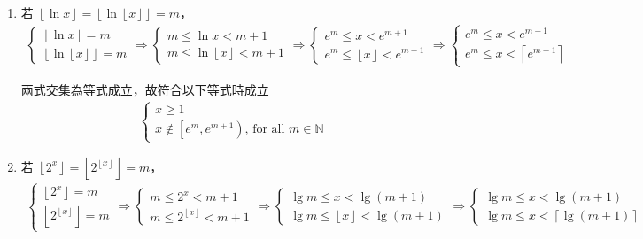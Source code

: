 \documentclass[11pt]{article}
\begin{document}
\begin{enumerate}
	\item 若 $\left \lfloor \ln x \right \rfloor = \left \lfloor \ln \left \lfloor x \right \rfloor \right \rfloor = m$，
		\begin{align*}
			\left\{\begin{matrix}
				\left \lfloor \ln x \right \rfloor = m\\ 
				\left \lfloor \ln \left \lfloor x \right \rfloor \right \rfloor = m
			\end{matrix}\right. 
			\Rightarrow
			\left\{\begin{matrix}
				m \le \ln x < m+1 \\ 
				m \le \ln \left \lfloor x \right \rfloor < m+1
			\end{matrix}\right.
			\Rightarrow
			\left\{\begin{matrix}
				e^m \le x < e^{m+1} \\ 
				e^m \le \left \lfloor x \right \rfloor < e^{m+1}
			\end{matrix}\right.
			\Rightarrow
			\left\{\begin{matrix}
				e^m \le x < e^{m+1} \\ 
				e^m \le x < \left \lceil e^{m+1} \right \rceil
			\end{matrix}\right.
		\end{align*}
		
		兩式交集為等式成立，故符合以下等式時成立
		\begin{align*}
			\left\{\begin{matrix}
				x \ge 1\\
				x \notin \left [ e^m, e^{m+1}\right ) \text{, for all } m \in \mathbb{N}
			\end{matrix}\right.
		\end{align*}
		
	\item 若 $\left \lfloor 2^x \right \rfloor = \left \lfloor 2^{\left \lfloor x \right \rfloor} \right \rfloor = m$，
		\begin{align*}
			\left\{\begin{matrix}
				\left \lfloor 2^x \right \rfloor = m\\ 
				\left \lfloor 2^{\left \lfloor x \right \rfloor} \right \rfloor = m
			\end{matrix}\right. 
			\Rightarrow
			\left\{\begin{matrix}
				m \le 2^x < m+1 \\ 
				m \le 2^{\left \lfloor x \right \rfloor} < m+1
			\end{matrix}\right.
			\Rightarrow
			\left\{\begin{matrix}
				\lg m \le x < \lg (m+1) \\ 
				\lg m \le \left \lfloor x \right \rfloor < \lg (m+1)
			\end{matrix}\right.
			\Rightarrow
			\left\{\begin{matrix}
				\lg m \le x < \lg (m+1) \\ 
				\lg m \le x < \left \lceil \lg (m+1) \right \rceil
			\end{matrix}\right.
		\end{align*}
		

\end{enumerate}
\end{document}
